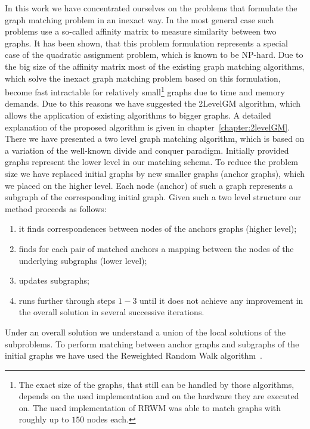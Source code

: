 In this work we have concentrated ourselves on the problems that formulate the graph matching problem in an inexact way. 
In the most general case such problems use a so-called affinity matrix to measure similarity between two graphs. 
It has been shown, that this problem formulation represents a special case of the quadratic assignment problem, which is known to be NP-hard. Due to the big size of the affinity matrix most of the existing graph matching algorithms, which solve the inexact graph matching problem based on this formulation, become fast intractable for relatively small\footnote{The exact size of the graphs, that still can be handled by those algorithms, depends on the used implementation and on the hardware they are executed on. The used implementation of RRWM was able to match graphs with roughly up to $150$ nodes each.} graphs due to time and memory demands. Due to this reasons we have suggested the 2LevelGM algorithm, which allows the application of existing algorithms to bigger graphs. A detailed explanation of the proposed algorithm is given in chapter~\ref{chapter:2levelGM}. There we have presented a two level graph matching algorithm, which is based on a variation of the well-known divide and conquer paradigm. Initially provided graphs represent the lower level in our matching schema. To reduce the problem size we have replaced initial graphs by new smaller graphs (anchor graphs), which we placed on the higher level. Each node (anchor) of such a graph represents a subgraph of the corresponding initial graph. Given such a two level structure our method proceeds as follows:
\begin{enumerate}
\item it finds correspondences between nodes of the anchors graphs (higher level);
\item finds for each pair of matched anchors a mapping between the nodes of the underlying subgraphs (lower level);
\item updates subgraphs;
\item runs further through steps $1-3$ until it does not achieve any improvement in the overall solution in several successive iterations.
\end{enumerate}
Under an overall solution we understand a union of the local solutions of the subproblems. To perform matching between anchor graphs and subgraphs of the initial graphs we have used the Reweighted Random Walk algorithm~\cite{Cho2010_RRWM}.

